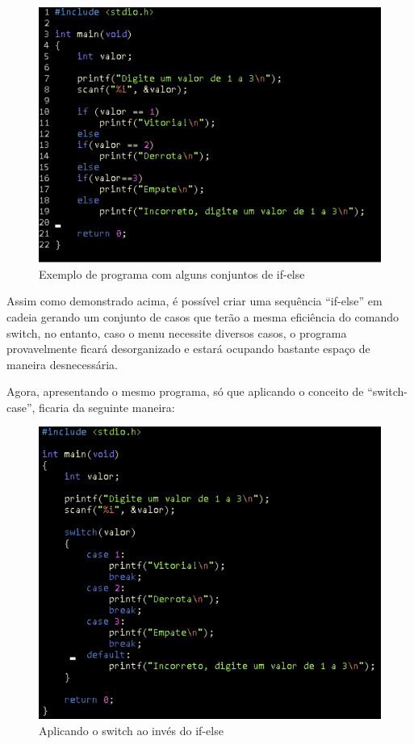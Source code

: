 \documentclass[a4paper,10pt]{article}  %
\begin{document}
 \begin{figure}[H]
 \centering
 \includegraphics[width=.80\linewidth]{imagens/ex2.png}
 \caption{Exemplo de programa com alguns conjuntos de if-else}
 \label{fig:xsorta}
\end{figure}

   Assim como demonstrado acima, é possível criar uma sequência “if-else” em cadeia gerando um conjunto de casos que terão a mesma eficiência do comando switch, no entanto, caso o menu necessite diversos casos, o programa provavelmente ficará desorganizado e estará ocupando bastante espaço de maneira desnecessária. \par
   

    Agora, apresentando o mesmo programa, só que aplicando o conceito de “switch-case”, ficaria da seguinte maneira:

\begin{figure}[H]
 \centering
 \includegraphics[width=.80\linewidth]{imagens/ex3.png}
 \caption{Aplicando o switch ao invés do if-else}
\end{figure}
\end{document}
